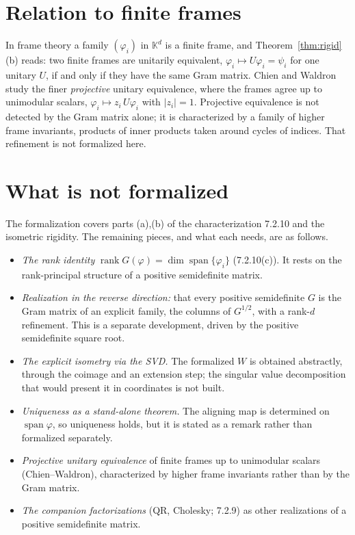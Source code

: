 \documentclass[11pt]{article}
\newcommand{\KK}{\mathbb K}
\newcommand{\gram}{G}
\DeclareMathOperator{\rank}{rank}
\DeclareMathOperator{\spann}{span}
\theoremstyle{remark}
\begin{document}
\section{Relation to finite frames}

In frame theory a family $(\varphi_i)$ in $\KK^{d}$ is a finite frame, and
Theorem~\ref{thm:rigid}(b) reads: two finite frames are unitarily equivalent,
$\varphi_i\mapsto U\varphi_i=\psi_i$ for one unitary $U$, if and only if they have
the same Gram matrix.  Chien and Waldron~\cite{ChienWaldron2016} study the finer
\emph{projective} unitary equivalence, where the frames agree up to unimodular
scalars, $\varphi_i\mapsto z_i\,U\varphi_i$ with $|z_i|=1$.  Projective equivalence
is not detected by the Gram matrix alone; it is characterized by a family of
higher frame invariants, products of inner products taken around cycles of
indices.  That refinement is not formalized here.

\section{What is not formalized}

The formalization covers parts (a),(b) of the characterization 7.2.10 and the
isometric rigidity.  The remaining pieces, and what each needs, are as follows.

\begin{itemize}
\item \emph{The rank identity} $\rank\gram(\varphi)=\dim\spann\{\varphi_i\}$
  (7.2.10(c)).  It rests on the rank-principal structure of a positive
  semidefinite matrix.
\item \emph{Realization in the reverse direction:} that every positive
  semidefinite $G$ is the Gram matrix of an explicit family, the columns of
  $G^{1/2}$, with a rank-$d$ refinement.  This is a separate development, driven
  by the positive semidefinite square root.
\item \emph{The explicit isometry via the SVD.}  The formalized $W$ is obtained
  abstractly, through the coimage and an extension step; the singular value
  decomposition that would present it in coordinates is not built.
\item \emph{Uniqueness as a stand-alone theorem.}  The aligning map is determined
  on $\spann\varphi$, so uniqueness holds, but it is stated as a remark rather
  than formalized separately.
\item \emph{Projective unitary equivalence} of finite frames up to unimodular
  scalars (Chien--Waldron), characterized by higher frame invariants rather than
  by the Gram matrix.
\item \emph{The companion factorizations} (QR, Cholesky; 7.2.9) as other
  realizations of a positive semidefinite matrix.
\end{itemize}
\end{document}
